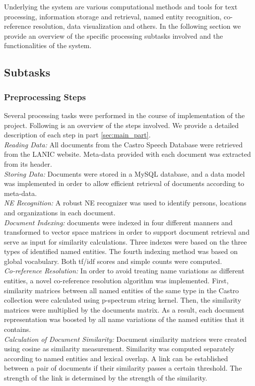 Underlying the system are various computational methods and tools for text processing, information storage and retrieval, named entity recognition, co-reference resolution, data visualization and others. In the following section we provide an overview of the specific processing subtasks involved and the functionalities of the system.

\subsection{Subtasks}
\label{sec:subtasks}
\subsubsection{Preprocessing Steps}
Several processing tasks were performed in the course of implementation of the project. Following is an overview of the steps involved. We provide a  detailed description of each step in part  \ref{sec:main_part}.\\
\emph{Reading Data:} All documents from the Castro Speech Database were retrieved from the LANIC website. Meta-data provided with each document was extracted from its header. \\
\emph{Storing Data:} Documents were stored in a MySQL database, and a data model was implemented in order to allow efficient retrieval of documents according to meta-data. \\
\emph{NE Recognition:} A robust NE recognizer was used to identify persons, locations and organizations in each document.\\
\emph{Document Indexing:} documents were indexed in four different manners and transformed to vector space matrices in order to support document retrieval and serve as input for similarity calculations. Three indexes were based on the three types of identified named entities. The fourth indexing method was based on global vocabulary. Both tf/idf scores and simple counts were computed.\\
\emph{Co-reference Resolution:} In order to avoid treating name variations as different entities, a novel co-reference resolution algorithm was implemented. First, similarity matrices between all named entities of the same type in the Castro collection were calculated using p-spectrum string kernel. Then, the similarity matrices were multiplied by the documents matrix. As a result, each document representation was boosted by all name variations of the named entities that it contains.\\
\emph{Calculation of Document Similarity:} Document similarity matrices were created using cosine as similarity measurement. Similarity was computed separately according to named entities and  lexical overlap. A link can be established between a pair of documents if their similarity passes a certain threshold. The strength of the link is determined by the strength of the similarity.

